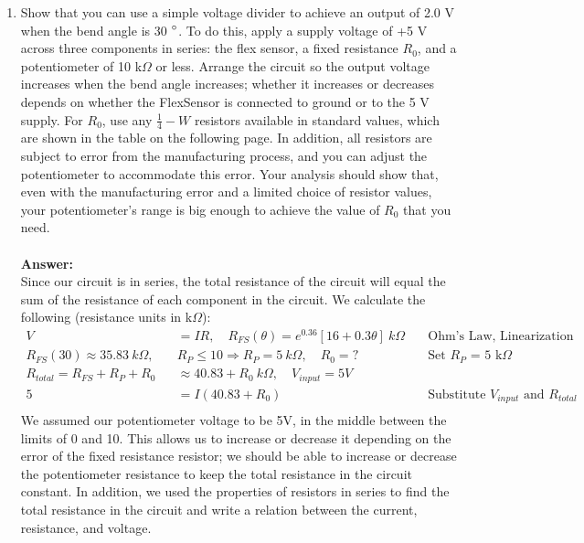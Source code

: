 \documentclass[12pt, a4paper]{article}
\begin{document}
\begin{enumerate}
\item Show that you can use a simple voltage divider to achieve an output of 2.0 V when the bend angle is 30 $\degree$. To do this, apply a supply voltage of +5 V across three components in series: the flex sensor, a fixed resistance $R_0$, and a potentiometer of 10 k$\Omega$ or less. Arrange the circuit so the output voltage increases when the bend angle increases; whether it increases or decreases depends on whether the FlexSensor is connected to ground or to the 5 V supply. For $R_0$, use any $\frac{1}{4}-W$ resistors available in standard values, which are
shown in the table on the following page. In addition, all resistors are subject to error from
the manufacturing process, and you can adjust the potentiometer to accommodate this
error. Your analysis should show that, even with the manufacturing error and a limited
choice of resistor values, your potentiometer’s range is big enough to achieve the value of
$R_0$ that you need.\\ \\
\textbf{Answer: } \\
Since our circuit is in series, the total resistance of the circuit will equal the sum of the resistance of each component in the circuit. We calculate the following (resistance units in k$\Omega$): \begin{align*}
V &= IR, \quad R_{FS}(\theta) = e^{0.36} [16 + 0.3 \theta] \ k\Omega \quad &\text{Ohm's Law, Linearization} \\
R_{FS}(30) \approx 35.83 \ k\Omega, \quad &R_{P} \leq 10 \Rightarrow R_P = 5 \ k\Omega, \quad R_0 = ? &\text{Set $R_{P}$ = 5 k$\Omega$}\\ 
R_{total} = R_{FS} + R_{P} + R_0 &\approx 40.83 + R_0 \ k\Omega, \quad V_{input} = 5 V\\
5 &= I (40.83 + R_0) \quad  &\text{Substitute $V_{input}$ and $R_{total}$}\\
\end{align*}
We assumed our potentiometer voltage to be 5V, in the middle between the limits of 0 and 10. This allows us to increase or decrease it depending on the error of the fixed resistance resistor; we should be able to increase or decrease the potentiometer resistance to keep the total resistance in the circuit constant. In addition, we used the properties of resistors in series to find the total resistance in the circuit and write a relation between the current, resistance, and voltage. \\ \\

\end{enumerate}
\end{document}
